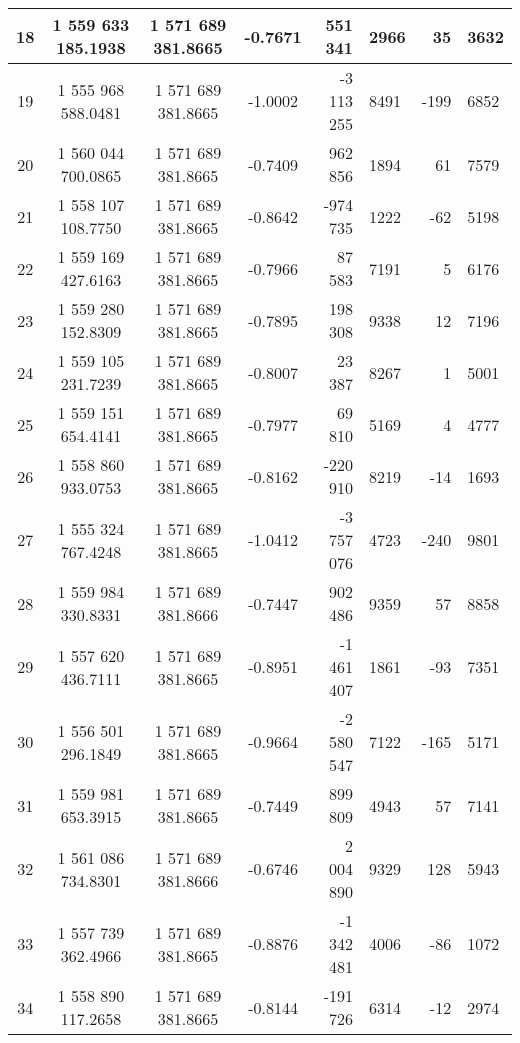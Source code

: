 \begin{center}
\begin{longtable}{|c|c|c|c|r@{.}l|r@{.}l|}
18 &  1 559 633 185.1938  & 1 571 689 381.8665   &  -0.7671  &     551 341 & 2966  &    35 & 3632 \\ \hline
19 &  1 555 968 588.0481  & 1 571 689 381.8665   &  -1.0002  &  -3 113 255 & 8491  &  -199 & 6852 \\ \hline
20 &  1 560 044 700.0865  & 1 571 689 381.8665   &  -0.7409  &     962 856 & 1894  &    61 & 7579 \\ \hline
21 &  1 558 107 108.7750  & 1 571 689 381.8665   &  -0.8642  &    -974 735 & 1222  &   -62 & 5198 \\ \hline
22 &  1 559 169 427.6163  & 1 571 689 381.8665   &  -0.7966  &      87 583 & 7191  &     5 & 6176 \\ \hline
23 &  1 559 280 152.8309  & 1 571 689 381.8665   &  -0.7895  &     198 308 & 9338  &    12 & 7196 \\ \hline
24 &  1 559 105 231.7239  & 1 571 689 381.8665   &  -0.8007  &      23 387 & 8267  &     1 & 5001 \\ \hline
25 &  1 559 151 654.4141  & 1 571 689 381.8665   &  -0.7977  &      69 810 & 5169  &     4 & 4777 \\ \hline
26 &  1 558 860 933.0753  & 1 571 689 381.8665   &  -0.8162  &    -220 910 & 8219  &   -14 & 1693 \\ \hline
27 &  1 555 324 767.4248  & 1 571 689 381.8665   &  -1.0412  &  -3 757 076 & 4723  &  -240 & 9801 \\ \hline
28 &  1 559 984 330.8331  & 1 571 689 381.8666   &  -0.7447  &     902 486 & 9359  &    57 & 8858 \\ \hline
29 &  1 557 620 436.7111  & 1 571 689 381.8665   &  -0.8951  &  -1 461 407 & 1861  &   -93 & 7351 \\ \hline
30 &  1 556 501 296.1849  & 1 571 689 381.8665   &  -0.9664  &  -2 580 547 & 7122  &  -165 & 5171 \\ \hline
31 &  1 559 981 653.3915  & 1 571 689 381.8665   &  -0.7449  &     899 809 & 4943  &    57 & 7141 \\ \hline
32 &  1 561 086 734.8301  & 1 571 689 381.8666   &  -0.6746  &   2 004 890 & 9329  &   128 & 5943 \\ \hline
33 &  1 557 739 362.4966  & 1 571 689 381.8665   &  -0.8876  &  -1 342 481 & 4006  &   -86 & 1072 \\ \hline
34 &  1 558 890 117.2658  & 1 571 689 381.8665   &  -0.8144  &    -191 726 & 6314  &   -12 & 2974 \\ \hline

\end{longtable}
\end{center}

